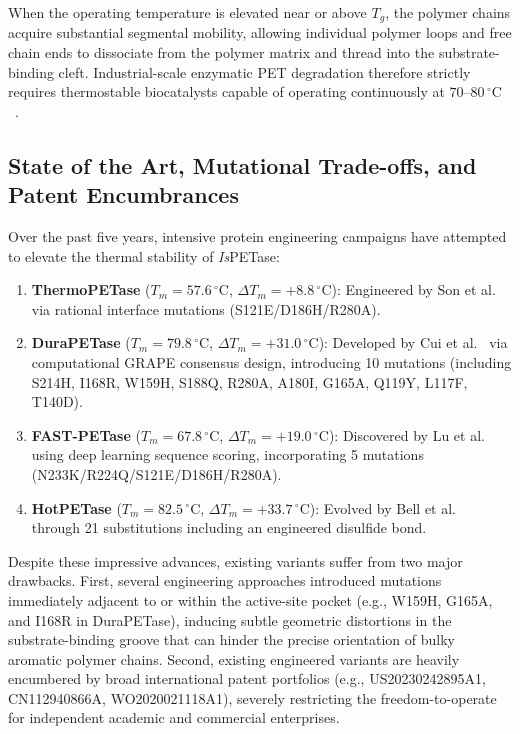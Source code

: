 \documentclass[10pt,twocolumn,a4paper]{article}
\begin{document}
When the operating temperature is elevated near or above $T_g$, the polymer chains acquire substantial segmental mobility, allowing individual polymer loops and free chain ends to dissociate from the polymer matrix and thread into the substrate-binding cleft. Industrial-scale enzymatic PET degradation therefore strictly requires thermostable biocatalysts capable of operating continuously at $70\text{--}80\,^\circ\text{C}$~\cite{Tournier2020}.

\subsection{State of the Art, Mutational Trade-offs, and Patent Encumbrances}
Over the past five years, intensive protein engineering campaigns have attempted to elevate the thermal stability of \textit{Is}PETase:
\begin{enumerate}
    \item \textbf{ThermoPETase} ($T_m = 57.6\,^\circ\text{C}$, $\Delta T_m = +8.8\,^\circ\text{C}$): Engineered by Son et al.~\cite{Son2019} via rational interface mutations (S121E/D186H/R280A).
    \item \textbf{DuraPETase} ($T_m = 79.8\,^\circ\text{C}$, $\Delta T_m = +31.0\,^\circ\text{C}$): Developed by Cui et al.~\cite{Cui2021} via computational GRAPE consensus design, introducing 10 mutations (including S214H, I168R, W159H, S188Q, R280A, A180I, G165A, Q119Y, L117F, T140D).
    \item \textbf{FAST-PETase} ($T_m = 67.8\,^\circ\text{C}$, $\Delta T_m = +19.0\,^\circ\text{C}$): Discovered by Lu et al.~\cite{Lu2022} using deep learning sequence scoring, incorporating 5 mutations (N233K/R224Q/S121E/D186H/R280A).
    \item \textbf{HotPETase} ($T_m = 82.5\,^\circ\text{C}$, $\Delta T_m = +33.7\,^\circ\text{C}$): Evolved by Bell et al.~\cite{Bell2022} through 21 substitutions including an engineered disulfide bond.
\end{enumerate}

Despite these impressive advances, existing variants suffer from two major drawbacks. First, several engineering approaches introduced mutations immediately adjacent to or within the active-site pocket (e.g., W159H, G165A, and I168R in DuraPETase), inducing subtle geometric distortions in the substrate-binding groove that can hinder the precise orientation of bulky aromatic polymer chains. Second, existing engineered variants are heavily encumbered by broad international patent portfolios (e.g., US20230242895A1, CN112940866A, WO2020021118A1), severely restricting the freedom-to-operate for independent academic and commercial enterprises.
\end{document}
